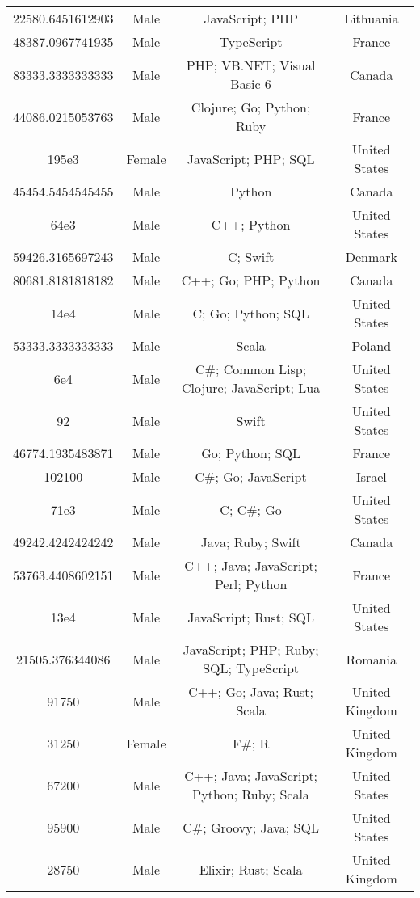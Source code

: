 \begin{center}
\begin{tabular}{ |c|c|c|c| }
22580.6451612903  &  Male  &  JavaScript; PHP  &  Lithuania  \\ 
48387.0967741935  &  Male  &  TypeScript  &  France  \\ 
83333.3333333333  &  Male  &  PHP; VB.NET; Visual Basic 6  &  Canada  \\ 
44086.0215053763  &  Male  &  Clojure; Go; Python; Ruby  &  France  \\ 
195e3  &  Female  &  JavaScript; PHP; SQL  &  United States  \\ 
45454.5454545455  &  Male  &  Python  &  Canada  \\ 
64e3  &  Male  &  C++; Python  &  United States  \\ 
59426.3165697243  &  Male  &  C; Swift  &  Denmark  \\ 
80681.8181818182  &  Male  &  C++; Go; PHP; Python  &  Canada  \\ 
14e4  &  Male  &  C; Go; Python; SQL  &  United States  \\ 
53333.3333333333  &  Male  &  Scala  &  Poland  \\ 
6e4  &  Male  &  C\#; Common Lisp; Clojure; JavaScript; Lua  &  United States  \\ 
92  &  Male  &  Swift  &  United States  \\ 
46774.1935483871  &  Male  &  Go; Python; SQL  &  France  \\ 
102100  &  Male  &  C\#; Go; JavaScript  &  Israel  \\ 
71e3  &  Male  &  C; C\#; Go  &  United States  \\ 
49242.4242424242  &  Male  &  Java; Ruby; Swift  &  Canada  \\ 
53763.4408602151  &  Male  &  C++; Java; JavaScript; Perl; Python  &  France  \\ 
13e4  &  Male  &  JavaScript; Rust; SQL  &  United States  \\ 
21505.376344086  &  Male  &  JavaScript; PHP; Ruby; SQL; TypeScript  &  Romania  \\ 
91750  &  Male  &  C++; Go; Java; Rust; Scala  &  United Kingdom  \\ 
31250  &  Female  &  F\#; R  &  United Kingdom  \\ 
67200  &  Male  &  C++; Java; JavaScript; Python; Ruby; Scala  &  United States  \\ 
95900  &  Male  &  C\#; Groovy; Java; SQL  &  United States  \\ 
28750  &  Male  &  Elixir; Rust; Scala  &  United Kingdom  \\ 

\end{tabular}
\end{center}
